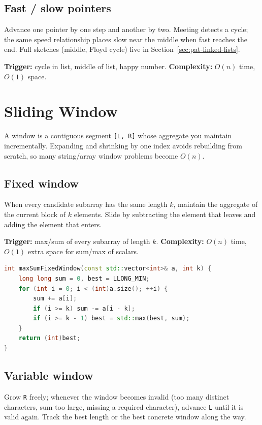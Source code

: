 \subsection{Fast / slow pointers}
\label{subsec:pat-fast-slow}
Advance one pointer by one step and another by two. Meeting detects a cycle;
the same speed relationship places slow near the middle when fast reaches the end.
Full sketches (middle, Floyd cycle) live in Section~\ref{sec:pat-linked-lists}.

\textbf{Trigger:} cycle in list, middle of list, happy number.
\newline
\textbf{Complexity:} $O(n)$ time, $O(1)$ space.

\section{Sliding Window}
\label{sec:pat-sliding-window}
A window is a contiguous segment \texttt{[L, R]} whose aggregate you maintain
incrementally. Expanding and shrinking by one index avoids rebuilding from scratch,
so many string/array window problems become $O(n)$.

\subsection{Fixed window}
\label{subsec:pat-fixed-window}
When every candidate subarray has the same length $k$, maintain the aggregate of
the current block of $k$ elements. Slide by subtracting the element that leaves
and adding the element that enters.

\textbf{Trigger:} max/sum of every subarray of length $k$.
\newline
\textbf{Complexity:} $O(n)$ time, $O(1)$ extra space for sum/max of scalars.

\begin{lstlisting}[language=C++]
int maxSumFixedWindow(const std::vector<int>& a, int k) {
    long long sum = 0, best = LLONG_MIN;
    for (int i = 0; i < (int)a.size(); ++i) {
        sum += a[i];
        if (i >= k) sum -= a[i - k];
        if (i >= k - 1) best = std::max(best, sum);
    }
    return (int)best;
}
\end{lstlisting}

\subsection{Variable window}
\label{subsec:pat-var-window}
Grow \texttt{R} freely; whenever the window becomes invalid (too many distinct
characters, sum too large, missing a required character), advance \texttt{L}
until it is valid again. Track the best length or the best concrete window
along the way.


